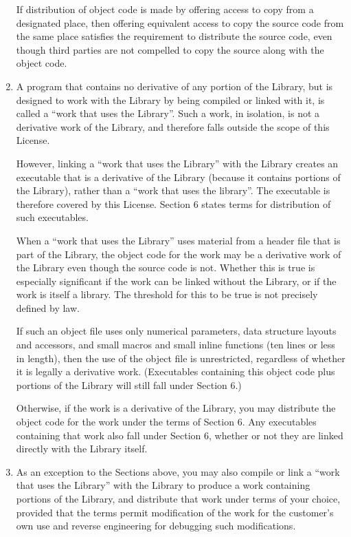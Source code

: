 \begin{enumerate}
  If distribution of object code is made by offering access to copy
from a designated place, then offering equivalent access to copy the
source code from the same place satisfies the requirement to
distribute the source code, even though third parties are not
compelled to copy the source along with the object code.

\item A program that contains no derivative of any portion of the
Library, but is designed to work with the Library by being compiled or
linked with it, is called a ``work that uses the Library''.  Such a
work, in isolation, is not a derivative work of the Library, and
therefore falls outside the scope of this License.

  However, linking a ``work that uses the Library'' with the Library
creates an executable that is a derivative of the Library (because it
contains portions of the Library), rather than a ``work that uses the
library''.  The executable is therefore covered by this License.
Section 6 states terms for distribution of such executables.

  When a ``work that uses the Library'' uses material from a header file
that is part of the Library, the object code for the work may be a
derivative work of the Library even though the source code is not.
Whether this is true is especially significant if the work can be
linked without the Library, or if the work is itself a library.  The
threshold for this to be true is not precisely defined by law.

  If such an object file uses only numerical parameters, data
structure layouts and accessors, and small macros and small inline
functions (ten lines or less in length), then the use of the object
file is unrestricted, regardless of whether it is legally a derivative
work.  (Executables containing this object code plus portions of the
Library will still fall under Section 6.)

  Otherwise, if the work is a derivative of the Library, you may
distribute the object code for the work under the terms of Section 6.
Any executables containing that work also fall under Section 6,
whether or not they are linked directly with the Library itself.

\item As an exception to the Sections above, you may also compile or
link a ``work that uses the Library'' with the Library to produce a
work containing portions of the Library, and distribute that work
under terms of your choice, provided that the terms permit
modification of the work for the customer's own use and reverse
engineering for debugging such modifications.


\end{enumerate}
